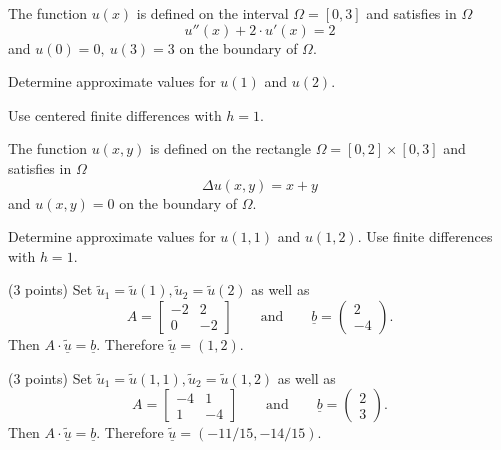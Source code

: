 \begin{teilaufgaben}
\item
The function $u(x)$ is defined on the interval $\Omega = [0,3]$ 
and satisfies in $\Omega$ 
\[
u''(x) + 2 \cdot u'(x) = 2
\]
and  $u(0) = 0, \ u(3) = 3$ on the boundary of $\Omega$. 

Determine approximate values for $u(1)$ and $u(2)$. 

Use centered finite differences with $h = 1$. 

\item
The function $u(x,y)$ is defined on the rectangle
$\Omega = [0,2] \times [0,3]$ 
and
satisfies in $\Omega$ 
\[
\Delta u(x,y) = x+y
\]
and $u(x,y) = 0$ on the boundary of $\Omega$.

Determine approximate values for $u(1,1)$ and $u(1,2)$.
Use finite differences with $h = 1$. 
\end{teilaufgaben}

\begin{loesung}
\begin{teilaufgaben}
\item
(3 points) Set $\tilde u_1 = \tilde u(1), \tilde u_2 = \tilde u(2)$
as well as
\[
A
=
\left[\begin{array}{rr} -2 & 2  \\ 0 & -2  \end{array}\right]
\qquad\mbox{and}\qquad
\underline{b}
=
\left(\begin{array}{r} 2 \\ -4 \end{array}\right).
\]
Then $A \cdot \underline{\tilde u} = \underline{b}$.
Therefore $\underline{\tilde u} = (1,2)$.

\item
(3 points) Set $\tilde u_1 = \tilde u(1,1), \tilde u_2 = \tilde u(1,2)$
as well as
\[
A
=
\left[\begin{array}{rr} -4 & 1  \\ 1 & -4  \end{array}\right]
\qquad\text{and}\qquad
\underline{b}
=
\left(\begin{array}{r} 2 \\ 3 \end{array}\right).
\]
Then $A \cdot \underline{\tilde u} = \underline{b}$.
Therefore $\underline{\tilde u} = (-11/15,-14/15)$.
\qedhere
\end{teilaufgaben}
\end{loesung}
